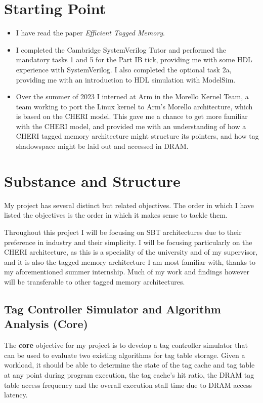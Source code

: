 \documentclass[10pt,a4paper]{article}
\begin{document}
\section*{Starting Point}
\begin{itemize}
	\item I have read the paper \textit{Efficient Tagged Memory}.
	\item I completed the Cambridge SystemVerilog Tutor \cite{sysvertutor} and performed the mandatory tasks 1 and 5 for the Part IB tick, providing me with some HDL experience with SystemVerilog. I also completed the optional task 2a, providing me with an introduction to HDL simulation with ModelSim.
	\item Over the summer of 2023 I interned at Arm in the Morello Kernel Team, a team working to port the Linux kernel to Arm's Morello architecture, which is based on the CHERI model. This gave me a chance to get more familiar with the CHERI model, and provided me with an understanding of how a CHERI tagged memory architecture might structure its pointers, and how tag shadowspace might be laid out and accessed in DRAM.
\end{itemize}

\section*{Substance and Structure}
My project has several distinct but related objectives. The order in which I have listed the objectives is the order in which it makes sense to tackle them.

Throughout this project I will be focusing on SBT architectures due to their preference in industry and their simplicity. I will be focusing particularly on the CHERI architecture, as this is a speciality of the university and of my supervisor, and it is also the tagged memory architecture I am most familiar with, thanks to my aforementioned summer internship. Much of my work and findings however will be transferable to other tagged memory architectures.

\subsection*{Tag Controller Simulator and Algorithm Analysis (Core)}
The \textbf{core} objective for my project is to develop a tag controller simulator that can be used to evaluate two existing algorithms for tag table storage. Given a workload, it should be able to determine the state of the tag cache and tag table at any point during program execution, the tag cache's hit ratio, the DRAM tag table access frequency and the overall execution stall time due to DRAM access latency.
\end{document}
